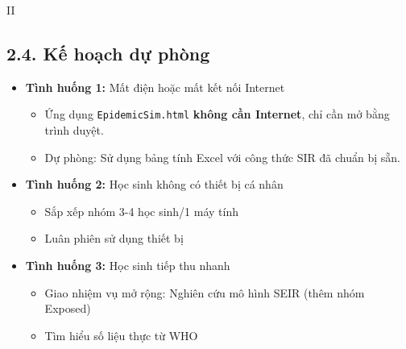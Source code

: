 \documentclass[12pt,a4paper]{article}
\begin{document}
\begin{competitionsection}{II}
\subsection*{2.4. Kế hoạch dự phòng}
\begin{itemize}[leftmargin=*,noitemsep]
\item \textbf{Tình huống 1:} Mất điện hoặc mất kết nối Internet
    \begin{itemize}
    \item Ứng dụng \texttt{EpidemicSim.html} \textbf{không cần Internet}, chỉ cần mở bằng trình duyệt.
    \item Dự phòng: Sử dụng bảng tính Excel với công thức SIR đã chuẩn bị sẵn.
    \end{itemize}
\item \textbf{Tình huống 2:} Học sinh không có thiết bị cá nhân
    \begin{itemize}
    \item Sắp xếp nhóm 3-4 học sinh/1 máy tính
    \item Luân phiên sử dụng thiết bị
    \end{itemize}
\item \textbf{Tình huống 3:} Học sinh tiếp thu nhanh
    \begin{itemize}
    \item Giao nhiệm vụ mở rộng: Nghiên cứu mô hình SEIR (thêm nhóm Exposed)
    \item Tìm hiểu số liệu thực từ WHO
    \end{itemize}
\end{itemize}
\end{competitionsection}
\end{document}
